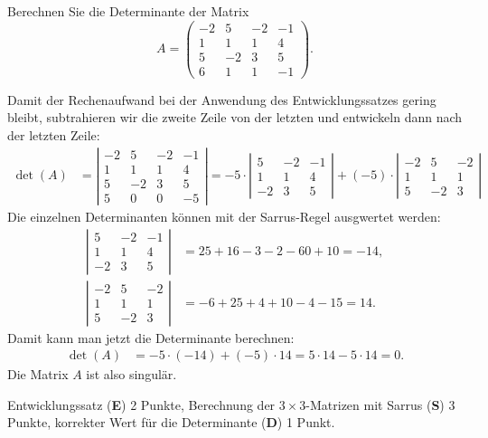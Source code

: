 Berechnen Sie die Determinante der Matrix
\[
A
=
\begin{pmatrix}
-2& 5&-2&-1\\
 1& 1& 1& 4\\
 5&-2& 3& 5\\
 6& 1& 1&-1
\end{pmatrix}.
\]


\begin{loesung}
Damit der Rechenaufwand bei der Anwendung des Entwicklungssatzes gering bleibt, subtrahieren wir die zweite Zeile von der letzten und entwickeln dann
nach der letzten Zeile:
\begin{align*}
\det(A)
&=
\left|\begin{matrix}
-2& 5&-2&-1\\
 1& 1& 1& 4\\
 5&-2& 3& 5\\
 5& 0& 0&-5
\end{matrix}\right|
=
-5\cdot
\left|\begin{matrix}
 5&-2&-1\\
 1& 1& 4\\
-2& 3& 5
\end{matrix}\right|
+(-5)\cdot
\left|\begin{matrix}
-2& 5&-2\\
 1& 1& 1\\
 5&-2& 3
\end{matrix}\right|
\end{align*}
Die einzelnen Determinanten können mit der Sarrus-Regel ausgwertet werden:
\begin{align*}
\left|\begin{matrix}
 5&-2&-1\\
 1& 1& 4\\
-2& 3& 5
\end{matrix}\right|
&=
25+16-3 -2-60+10
=
-14,
\\
\left|\begin{matrix}
-2& 5&-2\\
 1& 1& 1\\
 5&-2& 3
\end{matrix}\right|
&=
-6+25+4+10-4-15
=
14.
\end{align*}
Damit kann man jetzt die Determinante berechnen:
\begin{align*}
\det(A)
&=
-5\cdot (-14)+(-5)\cdot 14
=
5\cdot 14 - 5\cdot 14 =0.
\end{align*}
Die Matrix $A$ ist also singulär.
\end{loesung}

\begin{bewertung}
Entwicklungssatz ({\bf E}) 2 Punkte,
Berechnung der $3\times 3$-Matrizen mit Sarrus ({\bf S}) 3 Punkte,
korrekter Wert für die Determinante ({\bf D}) 1 Punkt.
\end{bewertung}


